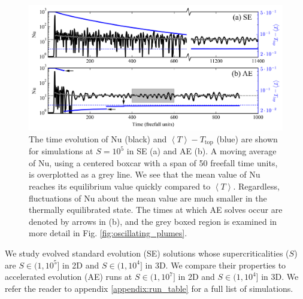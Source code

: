 \documentclass[aps, pre, onecolumn, nofootinbib, notitlepage, groupedaddress, amsfonts, amssymb, amsmath, longbibliography]{revtex4-1}
\newcommand{\angles}[1]{\ensuremath{\left\langle #1 \right\rangle}}
\begin{document}
\begin{figure}[b]
\includegraphics[width=\textwidth]{./figs/nu_v_time.png}
\caption{The time evolution of Nu (black) and $\angles{T} - T_{\text{top}}$ (blue)
are shown for simulations at $S = 10^5$ in SE (a) and AE (b).
A moving average of Nu, using a centered boxcar with a span of 50 freefall time
units, is overplotted as a grey line. 
We see that the mean value of Nu reaches its equilibrium value quickly
compared to $\angles{T}$.
Regardless, fluctuations of Nu about the mean
value are much smaller in the thermally equilibrated state.
The times at which AE solves occur are denoted by arrows in (b),
and the grey boxed region is examined in more detail in Fig. \ref{fig:oscillating_plumes}.
\label{fig:nu_v_time} }
\end{figure}


We study evolved standard evolution (SE) solutions whose supercriticalities ($S$) are 
$S \in (1, 10^5]$ in 2D and $S \in (1, 10^4]$ in
3D. We compare their properties to
accelerated evolution (AE) runs at $S \in (1, 10^7]$ in 2D and
$S \in (1, 10^4]$ in 3D.
We refer the reader to appendix \ref{appendix:run_table} for a full list of
simulations.
\end{document}
